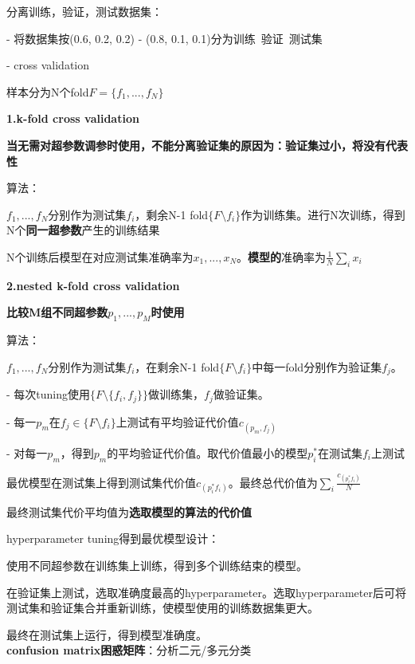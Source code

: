 \documentclass[UTF8]{ctexart}
\begin{document}
  分离训练，验证，测试数据集：
  
  - 将数据集按(0.6, 0.2, 0.2) - (0.8, 0.1, 0.1)分为训练\ 验证\ 测试集

  - cross validation

  \quad 样本分为N个fold$F = \{f_1, ..., f_N\}$

  \quad \textbf{1.k-fold cross validation}

  \quad \quad \textbf{当无需对超参数调参时使用，不能分离验证集的原因为：验证集过小，将没有代表性}

  \quad \quad 算法：

  \quad \quad \quad $f_1, ..., f_N$分别作为测试集$f_i$，剩余N-1 fold$\{F\setminus f_i\}$作为训练集。进行N次训练，得到N个\textbf{同一超参数}产生的训练结果
  
  \quad \quad \quad N个训练后模型在对应测试集准确率为${x_1, ..., x_N}$。\textbf{模型的}准确率为$\frac{1}{N}\sum_ix_i$

  \quad \textbf{2.nested k-fold cross validation}

  \quad \quad \textbf{比较M组不同超参数$p_1, ..., p_M$时使用}

  \quad \quad 算法：
  
  \quad \quad \quad $f_1, ..., f_N$分别作为测试集$f_i$，在剩余N-1 fold$\{F\setminus f_i\}$中每一fold分别作为验证集$f_j$。

  \quad \quad \quad - 每次tuning使用$\{F\setminus \{f_i, f_j\}\}$做训练集，$f_j$做验证集。

  \quad \quad \quad - 每一$p_m$在$f_j \in \{F \setminus f_i\}$上测试有平均验证代价值$c_{(p_m, f_j)}$

  \quad \quad \quad - 对每一$p_m$，得到$p_m$的平均验证代价值。取代价值最小的模型$p^*_i$在测试集$f_i$上测试

  \quad \quad \quad 最优模型在测试集上得到测试集代价值$c_{(p^*_i f_i)}$。最终总代价值为$\sum_i\frac{c_{(p^*_i f_i)} }{N}$

  \quad \quad \quad 最终测试集代价平均值为\textbf{选取模型的算法的代价值}

  hyperparameter tuning得到最优模型设计：
  
  \quad 使用不同超参数在训练集上训练，得到多个训练结束的模型。
  
  \quad 在验证集上测试，选取准确度最高的hyperparameter。选取hyperparameter后可将测试集和验证集合并重新训练，使模型使用的训练数据集更大。
  
  \quad 最终在测试集上运行，得到模型准确度。\\
\textbf{confusion matrix困惑矩阵}：分析二元/多元分类
  
\end{document}
